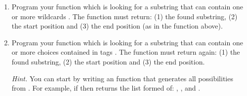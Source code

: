 \documentclass[11pt,class=report,crop=false]{standalone}
\begin{document}
\begin{activite}


\begin{enumerate}
  \item Program your  function
  which is looking for a substring that can contain one or more wildcards \og{}\fg{}.
  The function must return: (1) the found substring, (2) the start position and (3) the end position (as in the  function above).
  
  
  \item Program your  function
  which is looking for a substring that can contain one or more choices contained in tags \og{}\mot{[]}\fg{}. The function must return again: (1) the found substring, (2) the start position and (3) the end position.  
  
  \emph{Hint.} You can start by writing an  function that generates all possibilities from . For example, if 
   then  returns the list formed of:
  , ,  and .
    
\end{enumerate}   
     
\end{activite}


\newcommand{\rzero}{{\color{red}\textbf{0}}}
\newcommand{\run}{{\color{blue}\textbf{1}}}
\end{document}
